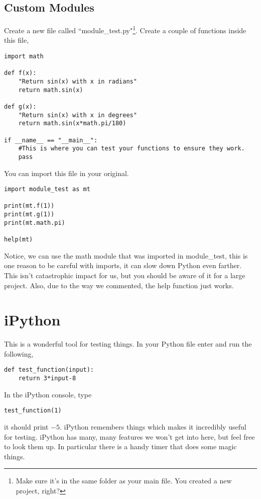 \documentclass[11pt,letterpaper]{article}
\begin{document}
\subsection{Custom Modules}
Create a new file called ``module\_test.py"\footnote{Make sure it's in the same folder as your main file. You created a new project, right?}. Create a couple of functions inside this file,
\begin{verbatim}
import math

def f(x):
    "Return sin(x) with x in radians"
    return math.sin(x)

def g(x):
    "Return sin(x) with x in degrees"
    return math.sin(x*math.pi/180)

if __name__ == "__main__":
    #This is where you can test your functions to ensure they work.
    pass

\end{verbatim}
You can import this file in your original.
\begin{verbatim}
import module_test as mt

print(mt.f(1))
print(mt.g(1))
print(mt.math.pi)

help(mt)
\end{verbatim}
Notice, we can use the math module that was imported in module\_test, this is one reason to be
careful with imports, it can slow down Python even farther. This isn't catastrophic impact for us,
but you should be aware of it for a large project. Also, due to the way we commented, the help 
function just works.


\section{iPython}
This is a wonderful tool for testing things. In your Python file enter and run the following,
\begin{verbatim}
def test_function(input):
    return 3*input-8
\end{verbatim}
In the iPython console, type
\begin{verbatim}
test_function(1)
\end{verbatim}
it should print $-5$. iPython remembers things which makes it incredibly useful for testing. iPython has many, many features we won't get 
into here, but feel free to look them up. In particular there is a handy timer that does some magic things.
\end{document}
